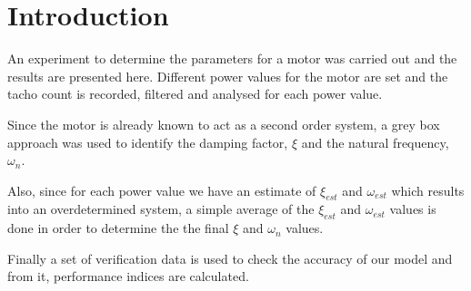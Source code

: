 \clearpage
\section{Introduction}

An experiment to determine the parameters for a \LEGO motor was carried out and the results are presented here. Different power values for the motor are set and the tacho count is recorded, filtered and analysed for each power value. 
\newline



Since the motor is already known to act as a second order system, a grey box approach was used to identify the damping factor, $\xi$ and the natural frequency, $\omega _n$. 
\newline



Also, since for each power value we have an estimate of $\xi _{est}$ and $\omega _{est}$ which results into an overdetermined system, a simple average of the $\xi _{est}$ and $\omega _{est}$ values is done in order to determine the the final $\xi$ and $\omega _n$ values.
\newline



Finally a set of verification data is used to check the accuracy of our model and from it, performance indices are calculated.